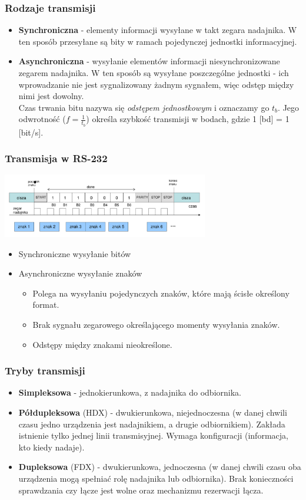 		\subsubsection{Rodzaje transmisji}
		\begin{itemize}
			\item \textbf{Synchroniczna} - elementy informacji wysyłane w takt zegara nadajnika. W ten sposób przesyłane są bity w ramach pojedynczej jednostki informacyjnej.
			\item \textbf{Asynchroniczna} - wysyłanie elementów informacji niesynchronizowane zegarem nadajnika. W ten sposób są wysyłane poszczególne jednostki - ich wprowadzanie nie jest sygnalizowany żadnym sygnałem, więc odstęp między nimi jest dowolny.\\
			Czas trwania bitu nazywa się \emph{odstępem jednostkowym} i oznaczamy go $t_{b}$. Jego odwrotność ($f=\frac{1}{t_{b}}$) określa szybkość transmisji w bodach, gdzie 1 [bd] = 1 [bit/s].
		\end{itemize}
		\subsubsection{Transmisja w RS-232}
		\includegraphics[width=9cm]{./wyklady/RS232_4_1.pdf}
		\begin{itemize}
			\item Synchroniczne wysyłanie bitów
			\item Asynchroniczne wysyłanie znaków
			\begin{itemize}
				\item Polega na wysyłaniu pojedynczych znaków, które mają ścisłe określony format.
				\item Brak sygnału zegarowego określającego momenty wysyłania znaków.
				\item Odstępy między znakami nieokreślone.
			\end{itemize}
		\end{itemize}
		\subsubsection{Tryby transmisji}
		\begin{itemize}
			\item \textbf{Simpleksowa} - jednokierunkowa, z nadajnika do odbiornika.
			\item \textbf{Półdupleksowa} (HDX) - dwukierunkowa, niejednoczesna (w danej chwili czasu jedno urządzenia jest nadajnikiem, a drugie odbiornikiem). Zakłada istnienie tylko jednej linii transmisyjnej. Wymaga konfiguracji (informacja, kto kiedy nadaje).
			\item \textbf{Dupleksowa} (FDX) - dwukierunkowa, jednoczesna (w danej chwili czasu oba urządzenia mogą spełniać rolę nadajnika lub odbiornika). Brak konieczności sprawdzania czy łącze jest wolne oraz mechanizmu rezerwacji łącza.
		\end{itemize}
